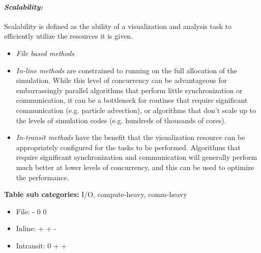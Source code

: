 \paragraph{\emph{Scalability:}}
Scalability is defined as the ability of a visualization and analysis task to efficiently utilize the resources it is given.
\begin{itemize}
    \item \emph{File based methods} 
    
    \item \emph{In-line methods} are constrained to running on the full allocation of the simulation. While this level of concurrency can be advantageous for embarrassingly parallel algorithms that perform little synchronization or communication, it can be a bottleneck for routines that require significant communication (e.g. particle advection), or algorithms that don't scale up to the levels of simulation codes (e.g. hundreds of thousands of cores).
    
    \item \emph{In-transit methods} have the benefit that the visualization resource can be appropriately configured for the tasks to be performed.  Algorithms that require significant synchronization and communication will generally perform much better at lower levels of concurrency, and this can be used to optimize the performance.
\end{itemize}
\textbf{Table sub categories:} I/O, compute-heavy, comm-heavy
\begin{itemize}
    \item File: - 0 0
    \item Inline: + + -
    \item Intransit: 0 + +
\end{itemize}

